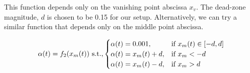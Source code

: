 This function depends only on the vanishing point abscissa $x_v$. The dead-zone magnitude, $d$ is chosen to be 0.15 for our setup. Alternatively, we can try a similar function that depends only on the middle point abscissa.

\footnotesize{
\begin{equation}
\alpha(t) = f_2(x_m(t)) \text{ s.t.,} \\
\begin{cases}
\alpha(t) = 0.001,&\text{if }x_m(t)\in[-d,d]\\
\alpha(t) = x_m(t)+d,&\text{if }x_m<-d\\
\alpha(t) = x_m(t)-d,&\text{if }x_m>d
\end{cases}
\label{eq:f2}
\end{equation}
}








